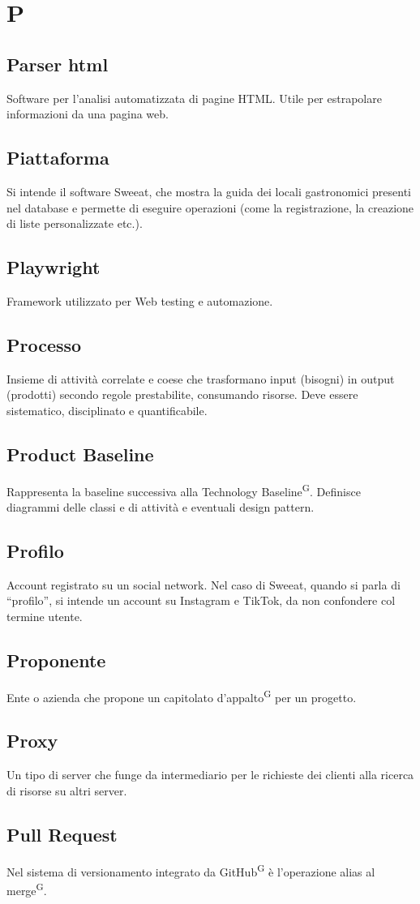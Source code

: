 \section{P}

\subsection{Parser html}
Software per l'analisi automatizzata di pagine HTML. Utile per estrapolare informazioni da una pagina web.

\subsection{Piattaforma} Si intende il software Sweeat, che mostra la guida dei locali gastronomici presenti nel database e permette di eseguire operazioni (come la registrazione, la creazione di liste personalizzate etc.).

\subsection{Playwright}
Framework utilizzato per Web testing e automazione.

\subsection{Processo}
Insieme di attività correlate e coese che trasformano input (bisogni) in output (prodotti) secondo regole prestabilite, consumando risorse. Deve essere sistematico, disciplinato e quantificabile.

\subsection{Product Baseline}
Rappresenta la baseline successiva alla Technology Baseline\textsuperscript{G}. Definisce diagrammi delle classi e di attività e eventuali design pattern. 

\subsection{Profilo} Account registrato su un social network. Nel caso di Sweeat, quando si parla di “profilo”, si intende un account su Instagram e TikTok, da non confondere col termine utente.

\subsection{Proponente}
Ente o azienda che propone un capitolato d'appalto\textsuperscript{G} per un progetto.

\subsection{Proxy}
Un tipo di server che funge da intermediario per le richieste dei clienti alla ricerca di risorse su altri server.

\subsection{Pull Request}
Nel sistema di versionamento integrato da GitHub\textsuperscript{G} è l'operazione alias al merge\textsuperscript{G}.

\clearpage